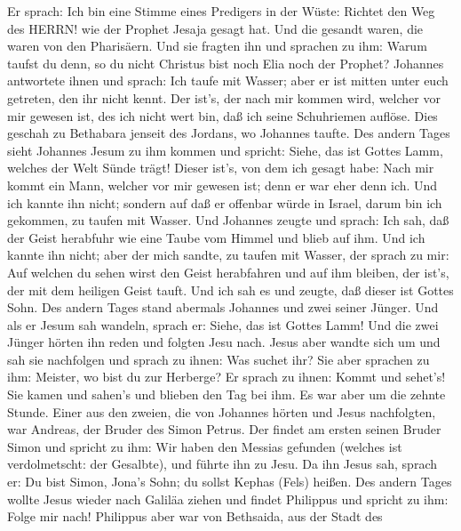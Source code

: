  Er sprach: Ich bin eine Stimme eines Predigers in der
Wüste: Richtet den Weg des HERRN! wie der Prophet Jesaja gesagt hat.
 Und die gesandt waren, die waren von den Pharisäern.
 Und sie fragten ihn und sprachen zu ihm: Warum taufst du
denn, so du nicht Christus bist noch Elia noch der Prophet?
 Johannes antwortete ihnen und sprach: Ich taufe mit
Wasser; aber er ist mitten unter euch getreten, den ihr nicht kennt.
 Der ist's, der nach mir kommen wird, welcher vor mir
gewesen ist, des ich nicht wert bin, daß ich seine Schuhriemen auflöse.
 Dies geschah zu Bethabara jenseit des Jordans, wo Johannes
taufte.  Des andern Tages sieht Johannes Jesum zu ihm
kommen und spricht: Siehe, das ist Gottes Lamm, welches der Welt Sünde
trägt!  Dieser ist's, von dem ich gesagt habe: Nach mir
kommt ein Mann, welcher vor mir gewesen ist; denn er war eher denn ich.
 Und ich kannte ihn nicht; sondern auf daß er offenbar
würde in Israel, darum bin ich gekommen, zu taufen mit Wasser.
 Und Johannes zeugte und sprach: Ich sah, daß der Geist
herabfuhr wie eine Taube vom Himmel und blieb auf ihm.  Und
ich kannte ihn nicht; aber der mich sandte, zu taufen mit Wasser, der
sprach zu mir: Auf welchen du sehen wirst den Geist herabfahren und auf
ihm bleiben, der ist's, der mit dem heiligen Geist tauft. 
Und ich sah es und zeugte, daß dieser ist Gottes Sohn.  Des
andern Tages stand abermals Johannes und zwei seiner Jünger.
 Und als er Jesum sah wandeln, sprach er: Siehe, das ist
Gottes Lamm!  Und die zwei Jünger hörten ihn reden und
folgten Jesu nach.  Jesus aber wandte sich um und sah sie
nachfolgen und sprach zu ihnen: Was suchet ihr? Sie aber sprachen zu
ihm: Meister, wo bist du zur Herberge?  Er sprach zu ihnen:
Kommt und sehet's! Sie kamen und sahen's und blieben den Tag bei ihm. Es
war aber um die zehnte Stunde.  Einer aus den zweien, die
von Johannes hörten und Jesus nachfolgten, war Andreas, der Bruder des
Simon Petrus.  Der findet am ersten seinen Bruder Simon und
spricht zu ihm: Wir haben den Messias gefunden (welches ist
verdolmetscht: der Gesalbte),  und führte ihn zu Jesu. Da
ihn Jesus sah, sprach er: Du bist Simon, Jona's Sohn; du sollst Kephas
(Fels) heißen.  Des andern Tages wollte Jesus wieder nach
Galiläa ziehen und findet Philippus und spricht zu ihm: Folge mir nach!
 Philippus aber war von Bethsaida, aus der Stadt des
